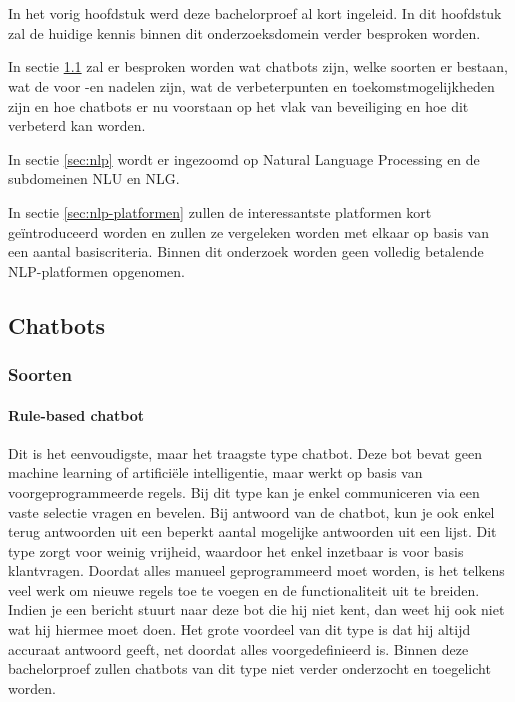 \chapter{}
\label{ch:stand-van-zaken}

In het vorig hoofdstuk werd deze bachelorproef al kort ingeleid. In dit hoofdstuk zal de huidige kennis binnen dit onderzoeksdomein verder besproken worden.

In sectie \ref{sec:chatbots} zal er besproken worden wat chatbots zijn, welke soorten er bestaan, wat de voor -en nadelen zijn, wat de verbeterpunten en toekomstmogelijkheden zijn en hoe chatbots er nu voorstaan op het vlak van beveiliging en hoe dit verbeterd kan worden.

In sectie \ref{sec:nlp} wordt er ingezoomd op Natural Language Processing en de subdomeinen NLU en NLG.

In sectie \ref{sec:nlp-platformen} zullen de interessantste platformen kort geïntroduceerd worden en zullen ze vergeleken worden met elkaar op basis van een aantal basiscriteria. Binnen dit onderzoek worden geen volledig betalende NLP-platformen opgenomen.

\newpage
\section{Chatbots}
\label{sec:chatbots}

\subsection{Soorten}
\label{subsec:soorten}

\subsubsection{Rule-based chatbot}
\label{subsubsec:chatbots-soorten-rule-based-chatbot}

Dit is het eenvoudigste, maar het traagste type chatbot. Deze bot bevat geen machine learning of artificiële intelligentie, maar werkt op basis van voorgeprogrammeerde regels. Bij dit type kan je enkel communiceren via een vaste selectie vragen en bevelen. Bij antwoord van de chatbot, kun je ook enkel terug antwoorden uit een beperkt aantal mogelijke antwoorden uit een lijst. Dit type zorgt voor weinig vrijheid, waardoor het enkel inzetbaar is voor basis klantvragen. Doordat alles manueel geprogrammeerd moet worden, is het telkens veel werk om nieuwe regels toe te voegen en de functionaliteit uit te breiden. Indien je een bericht stuurt naar deze bot die hij niet kent, dan weet hij ook niet wat hij hiermee moet doen. Het grote voordeel van dit type is dat hij altijd accuraat antwoord geeft, net doordat alles voorgedefinieerd is. Binnen deze bachelorproef zullen chatbots van dit type niet verder onderzocht en toegelicht worden.

